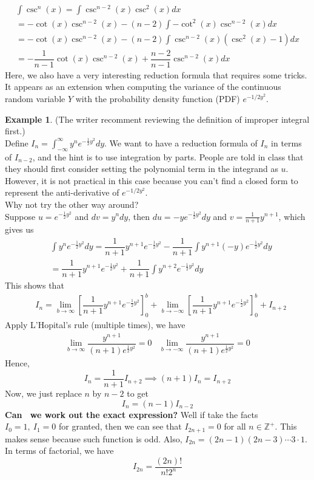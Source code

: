 \documentclass{article}
\theoremstyle{definition}
\theoremstyle{definition}
\theoremstyle{definition}
\theoremstyle{definition}
\theoremstyle{definition}
\theoremstyle{definition}
\newtheorem{example}{Example}
\theoremstyle{definition}
\theoremstyle{definition}
\theoremstyle{definition}
\newcommand{\ZZ}{\mathbb{Z}}
\begin{document}
\begin{align*}
    \int\csc^n(x)=\int\csc^{n-2}(x)\csc^2(x)dx\\
    =-\cot(x)\csc^{n-2}(x)-(n-2)\int -\cot^2(x)\csc^{n-2}(x)dx\\
    =-\cot(x)\csc^{n-2}(x)-(n-2)\int\csc^{n-2}(x)(\csc^2(x)-1)dx\\
    =-\dfrac{1}{n-1}\cot(x)\csc^{n-2}(x)+\dfrac{n-2}{n-1}\csc^{n-2}(x)dx
\end{align*}
Here, we also have a very interesting reduction formula that requires some tricks.
It appears as an extension when computing the variance of the continuous random variable $Y$ with the probability density function (PDF) $e^{-1/2y^2}$.\\
\begin{example}
    (The writer recomment reviewing the definition of improper integral first.)\\
    Define $I_n=\int_{-\infty}^\infty y^ne^{-\frac{1}{2}y^2}dy$. We want to have a reduction formula of $I_n$ in terms of $I_{n-2}$, and the hint is to use integration by parts.
    People are told in class that they should first consider setting the polynomial term in the integrand as $u$. However, it is not practical in this case because you can't find a closed form to represent the anti-derivative of $e^{-1/2y^2}$.\\
    Why not try the other way around?\\
    Suppose $u=e^{-\frac{1}{2}y^2}$ and $dv=y^ndy$, then $du=-ye^{-\frac{1}{2}y^2}dy$ and $v=\frac{1}{n+1}y^{n+1}$, which gives us
    \begin{align*}
        &\int y^ne^{-\frac{1}{2}y^2}dy=\dfrac{1}{n+1}y^{n+1}e^{-\frac{1}{2}y^2}-\dfrac{1}{n+1}\int y^{n+1}(-y)e^{-\frac{1}{2}y^2}dy\\
        &=\dfrac{1}{n+1}y^{n+1}e^{-\frac{1}{2}y^2}+\dfrac{1}{n+1}\int y^{n+2}e^{-\frac{1}{2}y^2}dy
    \end{align*}
    This shows that
    \begin{align*}
        &I_n=\lim_{b\to\infty}\left[\dfrac{1}{n+1}y^{n+1}e^{-\frac{1}{2}y^2}\right]_0^b+\lim_{b\to-\infty}\left[\dfrac{1}{n+1}y^{n+1}e^{-\frac{1}{2}y^2}\right]_0^b+I_{n+2}
    \end{align*}
    Apply L'Hopital's rule (multiple times), we have
    \begin{align*}
        \lim_{b\to\infty}\dfrac{y^{n+1}}{(n+1)e^{\frac{1}{2}y^2}}=0 & \lim_{b\to -\infty}\dfrac{y^{n+1}}{(n+1)e^{\frac{1}{2}y^2}}=0
    \end{align*}
    Hence, 
    \[
        I_n=\dfrac{1}{n+1}I_{n+2} \implies (n+1)I_n=I_{n+2}  
    \]
    Now, we just replace $n$ by $n-2$ to get
    \[I_n=(n-1)I_{n-2}\]
    \textbf{Can~ we work out the exact expression?}
    Well if take the facts $I_0=1,\ I_1=0$ for granted, then we can see that $I_{2n+1}=0$ for all $n\in\ZZ^+$. This makes sense because such function is odd.
    Also, $I_{2n}=(2n-1)(2n-3)\cdots 3\cdot 1$. In terms of factorial, we have
    \[I_{2n}=\dfrac{(2n)!}{n!2^n}\]
\end{example}
\end{document}

